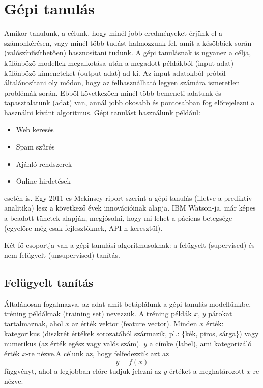 \documentclass[a4paper,12pt]{article}
\begin{document}
\newpage
\section{Gépi tanulás}

Amikor tanulunk, a célunk, hogy minél jobb eredményeket érjünk el a számonkérésen, vagy minél több tudást halmozzunk fel, amit a későbbiek során (valószínűsíthetően) hasznosítani tudunk. A gépi tanulásnak is ugyanez a célja, különböző modellek megalkotása után a megadott példákból (input adat) különböző kimeneteket (output adat) ad ki. Az input adatokból próbál általánosítani oly módon, hogy az felhasználható legyen számára ismeretlen problémák során. Ebből következően minél több bemeneti adatunk és tapasztalatunk (adat) van, annál jobb okosabb és pontosabban fog előrejelezni a használni kívánt algoritmus. Gépi tanulást használunk például: 
\begin{itemize}
\item Web keresés
\item Spam szűrés
\item Ajánló rendszerek
\item Online hirdetések
\end{itemize}
esetén is. 
Egy 2011-es Mckinsey riport szerint a gépi tanulás (illetve a prediktív analitika) lesz a következő évek innovációinak alapja. IBM Watson-ja, már képes a beadott tünetek alapján, megjósolni, hogy mi lehet a páciens betegsége (egyelőre még csak fejlesztőknek, API-n keresztül). \newline

Két fő csoportja van a gépi tanulási algoritmusoknak: a felügyelt (supervised) és nem felügyelt (unsupervised) tanítás.

\subsection{Felügyelt tanítás}

Általánosan fogalmazva, az adat amit betáplálunk a gépi tanulás modellünkbe, tréning példáknak (training set) nevezzük. A tréning példák $x$, $y$ párokat tartalmaznak, ahol $x$ az érték vektor (feature vector). Minden $x$ érték: kategorikus (diszkrét értékek sorozatából származik, pl.: \{kék, piros, sárga\}) vagy numerikus (az érték egész vagy valós szám). $y$ a címke (label), ami kategorizáló érték $x$-re nézve.A célunk az, hogy felfedezzük azt az 
\begin{equation*} y=f(x)
\end{equation*}
függvényt, ahol a legjobban előre tudjuk jelezni az $y$ értéket a meghatározott $x$-re nézve.
\end{document}
